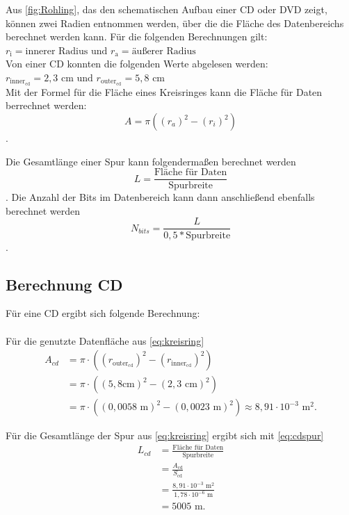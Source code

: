 \documentclass[9pt,twocolumn,twoside]{pnas-new}
\begin{document}
Aus \ref{fig:Rohling}, das den schematischen Aufbau einer CD oder DVD zeigt, können zwei Radien entnommen werden, über die die Fläche des Datenbereichs berechnet werden kann.
Für die folgenden Berechnungen gilt:  \begin{math} r_{\mbox{i}}  = \mbox{innerer Radius und } r_{\mbox{a}} = \mbox{äußerer Radius} \end{math} \\
Von einer CD konnten die folgenden Werte abgelesen werden: \begin{math} r_{\mbox{inner}_{\mbox{cd}}} = 2,3 \mbox{ cm und } r_{\mbox{outer}_{\mbox{cd}}} = 5,8 \mbox{ cm} \end{math} \\

Mit der Formel für die Fläche eines Kreisringes \cite[Seite 147]{Bartsch2014} kann die Fläche für Daten berrechnet werden: \begin{equation} \label{eq:kreisring} A = \pi((r_a)^2-(r_i)^2)  \end{equation}. 

Die Gesamtlänge einer Spur kann folgendermaßen berechnet werden \begin{equation} \label{eq:gesamtlänge} L = \frac{\mbox{Fläche für Daten}}{\mbox{Spurbreite}} \end{equation}.
Die Anzahl der Bits im Datenbereich kann dann anschließend ebenfalls berechnet werden \begin{equation} \label{eq:bitanzahl} N_{bits} = \frac{L}{0,5*\mbox{Spurbreite}} \end{equation}.

\subsection{Berechnung CD}
Für eine CD ergibt sich folgende Berechnung: \\ \\
Für die genutzte Datenfläche aus \eqref{eq:kreisring}
\begin{align*}
 A_{cd} &= \pi\cdot((r_{\mbox{outer}_{\mbox{cd}}})^2-(r_{\mbox{inner}_{\mbox{cd}}})^2)\\	
&= \pi\cdot((5,8\mbox{cm})^2-(2,3\mbox{ cm})^2) \\
 &=  \pi\cdot((0,0058\mbox{ m})^2-(0,0023\mbox{ m})^2) \approx  8,91\cdot10^{-3}\mbox{ m}^2.
\end{align*}

Für die Gesamtlänge der Spur aus \eqref{eq:kreisring} ergibt sich mit \eqref{eq:cdspur}
\begin{align*}
 L_{cd} &= \frac{\mbox{Fläche für Daten}}{\mbox{Spurbreite}}\\
 &= \frac{A_{\mbox{cd}}}{S_{\mbox{cd}}}\\
 &= \frac{8,91\cdot10^{-3}\mbox{ m}^2}{1,78\cdot10^{-6}\mbox{ m} }\\
 &= 5005\mbox{ m}.
\end{align*}
\end{document}
